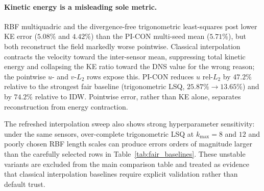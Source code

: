 \paragraph{Kinetic energy is a misleading sole metric.}
RBF multiquadric and the divergence-free trigonometric least-squares post lower KE error ($5.08\%$ and $4.42\%$) than the PI-CON multi-seed mean ($5.71\%$), but both reconstruct the field markedly worse pointwise. Classical interpolation contracts the velocity toward the inter-sensor mean, suppressing total kinetic energy and collapsing the KE ratio toward the DNS value for the wrong reason; the pointwise $u$- and $v$-$L_2$ rows expose this. PI-CON reduces $u$ rel-$L_2$ by $47.2\%$ relative to the strongest fair baseline (trigonometric LSQ, $25.87\%\to13.65\%$) and by $74.2\%$ relative to IDW. Pointwise error, rather than KE alone, separates reconstruction from energy contraction.

The refreshed interpolation sweep also shows strong hyperparameter sensitivity: under the same sensors, over-complete trigonometric LSQ at $k_{\max}=8$ and $12$ and poorly chosen RBF length scales can produce errors orders of magnitude larger than the carefully selected rows in Table~\ref{tab:fair_baselines}. These unstable variants are excluded from the main comparison table and treated as evidence that classical interpolation baselines require explicit validation rather than default trust.


